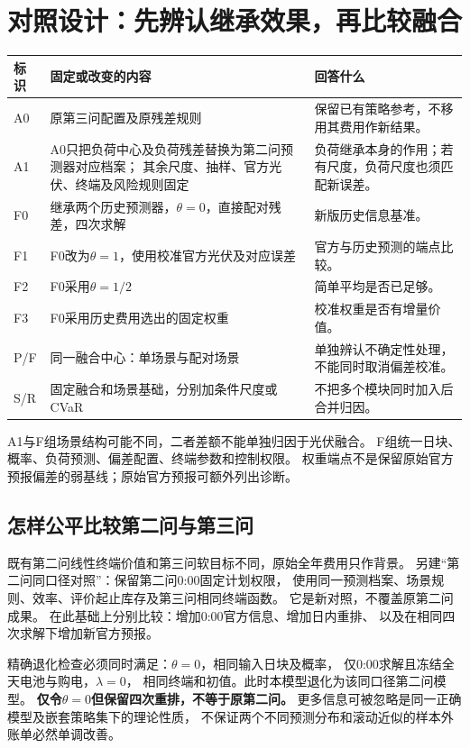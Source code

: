 \documentclass[UTF8,11pt]{ctexart}
\begin{document}
\section{对照设计：先辨认继承效果，再比较融合}
\begin{longtable}{p{1.6cm}p{7.0cm}p{5.2cm}}
\toprule 标识 & 固定或改变的内容 & 回答什么\\ \midrule
\endhead
A0 & 原第三问配置及原残差规则 & 保留已有策略参考，不移用其费用作新结果。\\
A1 & A0只把负荷中心及负荷残差替换为第二问预测器对应档案；
其余尺度、抽样、官方光伏、终端及风险规则固定 & 负荷继承本身的作用；若有尺度，负荷尺度也须匹配新误差。\\
F0 & 继承两个历史预测器，$\theta=0$，直接配对残差，四次求解 & 新版历史信息基准。\\
F1 & F0改为$\theta=1$，使用校准官方光伏及对应误差 & 官方与历史预测的端点比较。\\
F2 & F0采用$\theta=1/2$ & 简单平均是否已足够。\\
F3 & F0采用历史费用选出的固定权重 & 校准权重是否有增量价值。\\
P/F & 同一融合中心：单场景与配对场景 & 单独辨认不确定性处理，不能同时取消偏差校准。\\
S/R & 固定融合和场景基础，分别加条件尺度或CVaR & 不把多个模块同时加入后合并归因。\\
\bottomrule
\end{longtable}
A1与F组场景结构可能不同，二者差额不能单独归因于光伏融合。
F组统一日块、概率、负荷预测、偏差配置、终端参数和控制权限。
权重端点不是保留原始官方预报偏差的弱基线；原始官方预报可额外列出诊断。

\subsection{怎样公平比较第二问与第三问}
既有第二问线性终端价值和第三问软目标不同，原始全年费用只作背景。
另建“第二问同口径对照”：保留第二问0:00固定计划权限，
使用同一预测档案、场景规则、效率、评价起止库存及第三问相同终端函数。
它是新对照，不覆盖原第二问成果。
在此基础上分别比较：增加0:00官方信息、增加日内重排、
以及在相同四次求解下增加新官方预报。

精确退化检查必须同时满足：$\theta=0$，相同输入日块及概率，
仅0:00求解且冻结全天电池与购电，$\lambda=0$，
相同终端和初值。此时本模型退化为该同口径第二问模型。
\textbf{仅令$\theta=0$但保留四次重排，不等于原第二问。}
更多信息可被忽略是同一正确模型及嵌套策略集下的理论性质，
不保证两个不同预测分布和滚动近似的样本外账单必然单调改善。
\end{document}
